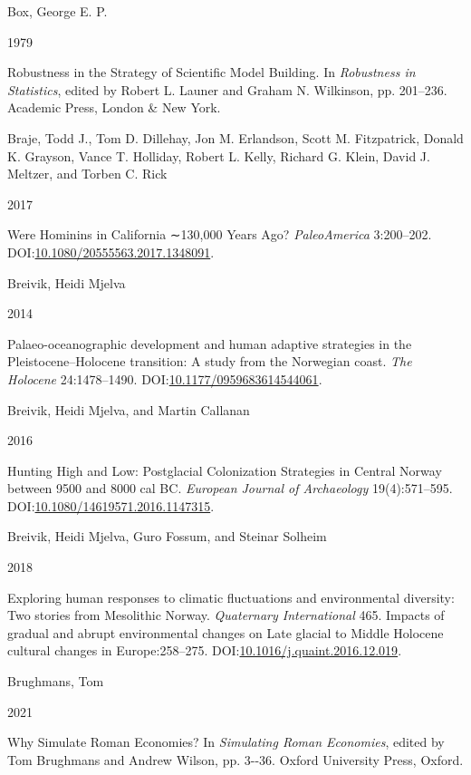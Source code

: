 \documentclass[
  a4paper,
  oneside]{uiophdthesis}
\newlength{\cslhangindent}
\newlength{\csllabelwidth}
\newlength{\cslentryspacingunit} %
\newenvironment{CSLReferences}[2] %
 {%
  \setlength{\parindent}{0pt}
  \ifodd #1
  \let\oldpar\par
  \def\par{\hangindent=\cslhangindent\oldpar}
  \fi
  \setlength{\parskip}{#2\cslentryspacingunit}
 }%
 {}
\newcommand{\CSLBlock}[1]{#1\hfill\break}
\newcommand{\CSLLeftMargin}[1]{\parbox[t]{\csllabelwidth}{#1}}
\newcommand{\CSLRightInline}[1]{\parbox[t]{\linewidth - \csllabelwidth}{#1}\break}
\begin{document}
\begin{CSLReferences}{0}{0}
\leavevmode{}%
\CSLBlock{Box, George E. P.}
\CSLLeftMargin{ 1979}
\CSLRightInline{{Robustness in the Strategy of Scientific Model Building}. In \emph{{Robustness in Statistics}}, edited by Robert L. Launer and Graham N. Wilkinson, pp. 201--236. Academic Press, London \& New York.}

\leavevmode{}%
\CSLBlock{Braje, Todd J., Tom D. Dillehay, Jon M. Erlandson, Scott M. Fitzpatrick, Donald K. Grayson, Vance T. Holliday, Robert L. Kelly, Richard G. Klein, David J. Meltzer, and Torben C. Rick}
\CSLLeftMargin{ 2017}
\CSLRightInline{Were Hominins in California ∼130,000 Years Ago? \emph{PaleoAmerica} 3:200--202. DOI:\href{https://doi.org/10.1080/20555563.2017.1348091}{10.1080/20555563.2017.1348091}.}

\leavevmode{}%
\CSLBlock{Breivik, Heidi Mjelva}
\CSLLeftMargin{ 2014}
\CSLRightInline{Palaeo-oceanographic development and human adaptive strategies in the Pleistocene--Holocene transition: A study from the Norwegian coast. \emph{The Holocene} 24:1478--1490. DOI:\href{https://doi.org/10.1177/0959683614544061}{10.1177/0959683614544061}.}

\leavevmode{}%
\CSLBlock{Breivik, Heidi Mjelva, and Martin Callanan}
\CSLLeftMargin{ 2016}
\CSLRightInline{{Hunting High and Low: Postglacial Colonization Strategies in Central Norway between 9500 and 8000 cal BC}. \emph{European Journal of Archaeology} 19(4):571--595. DOI:\href{https://doi.org/10.1080/14619571.2016.1147315}{10.1080/14619571.2016.1147315}.}

\leavevmode{}%
\CSLBlock{Breivik, Heidi Mjelva, Guro Fossum, and Steinar Solheim}
\CSLLeftMargin{ 2018}
\CSLRightInline{Exploring human responses to climatic fluctuations and environmental diversity: Two stories from Mesolithic Norway. \emph{Quaternary International} 465. Impacts of gradual and abrupt environmental changes on Late glacial to Middle Holocene cultural changes in Europe:258--275. DOI:\href{https://doi.org/10.1016/j.quaint.2016.12.019}{10.1016/j.quaint.2016.12.019}.}

\leavevmode{}%
\CSLBlock{Brughmans, Tom}
\CSLLeftMargin{ 2021}
\CSLRightInline{{Why Simulate Roman Economies?} In \emph{{Simulating Roman Economies}}, edited by Tom Brughmans and Andrew Wilson, pp. 3-\/-36. Oxford University Press, Oxford.}


\end{CSLReferences}
\end{document}
